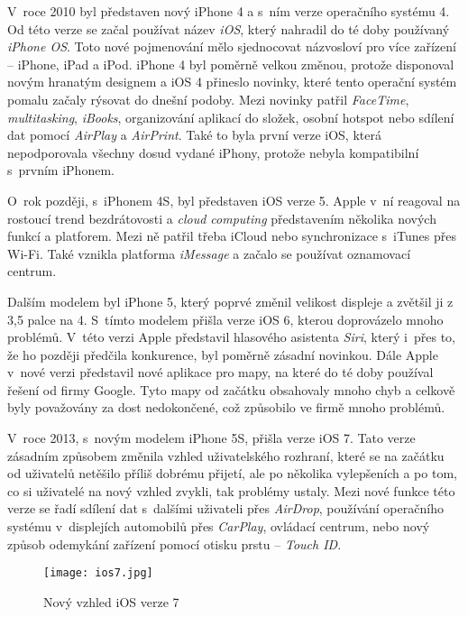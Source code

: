 V~roce 2010 byl představen nový iPhone 4 a s~ním verze operačního systému 4. Od této verze se začal používat název \emph{iOS}, který nahradil do té doby používaný \emph{iPhone OS}. Toto nové pojmenování mělo sjednocovat názvosloví pro více zařízení – iPhone, iPad a iPod. iPhone 4 byl poměrně velkou změnou, protože disponoval novým hranatým designem a iOS 4 přineslo novinky, které tento operační systém pomalu začaly rýsovat do dnešní podoby. Mezi novinky patřil \emph{FaceTime}, \emph{multitasking}, \emph{iBooks}, organizování aplikací do složek, osobní hotspot nebo sdílení dat pomocí \emph{AirPlay} a \emph{AirPrint}. Také to byla první verze iOS, která nepodporovala všechny dosud vydané iPhony, protože nebyla kompatibilní s~prvním iPhonem.

O~rok později, s~iPhonem 4S, byl představen iOS verze 5. Apple v~ní reagoval na rostoucí trend bezdrátovosti a \emph{cloud computing} představením několika nových funkcí a platforem. Mezi ně patřil třeba iCloud nebo synchronizace s~iTunes přes Wi-Fi. Také vznikla platforma \emph{iMessage} a začalo se používat oznamovací centrum.

Dalším modelem byl iPhone 5, který poprvé změnil velikost displeje a zvětšil ji z 3,5 palce na 4. S~tímto modelem přišla verze iOS 6, kterou doprovázelo mnoho problémů. V~této verzi Apple představil hlasového asistenta \emph{Siri}, který i~přes to, že ho později předčila konkurence, byl poměrně zásadní novinkou. Dále Apple v~nové verzi představil nové aplikace pro mapy, na které do té doby používal řešení od firmy Google. Tyto mapy od začátku obsahovaly mnoho chyb a celkově byly považovány za dost nedokončené, což způsobilo ve firmě mnoho problémů.

V~roce 2013, s~novým modelem iPhone 5S, přišla verze iOS 7. Tato verze zásadním způsobem změnila vzhled uživatelského rozhraní, které se na začátku od uživatelů netěšilo příliš dobrému přijetí, ale po několika vylepšeních a po tom, co si uživatelé na nový vzhled zvykli, tak problémy ustaly. Mezi nové funkce této verze se řadí sdílení dat s~dalšími uživateli přes \emph{AirDrop}, používání operačního systému v~displejích automobilů přes \emph{CarPlay}, ovládací centrum, nebo nový způsob odemykání zařízení pomocí otisku prstu – \emph{Touch ID}.

\begin{figure}[h]
	\centering
	\texttt{[image: ios7.jpg]}
	\caption{Nový vzhled iOS verze 7 \cite{ios-7-design}}
\end{figure}

